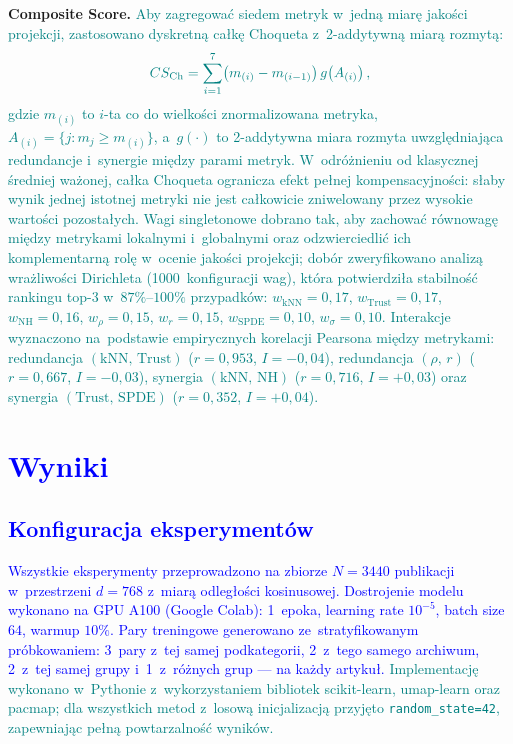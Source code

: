 \documentclass[a4paper,11pt,twocolumn]{article}
\newcommand{\hl}[1]{\textcolor{blue}{#1}}
\newcommand{\hlme}[1]{\textcolor{teal}{#1}}
\begin{document}
\textbf{Composite Score.}
\hlme{Aby zagregować siedem metryk w~jedną miarę jakości projekcji,
zastosowano dyskretną całkę Choqueta z~2-addytywną miarą rozmytą:}
\begin{equation}
  \hlme{CS_\text{Ch} = \sum_{i=1}^{7}
    \bigl(m_{(i)} - m_{(i-1)}\bigr)\, g\!\left(A_{(i)}\right),}
  \label{eq:choquet}
\end{equation}
\hlme{gdzie $m_{(i)}$ to $i$-ta co do wielkości znormalizowana metryka,
$A_{(i)} = \{j : m_j \geq m_{(i)}\}$, a~$g(\cdot)$ to 2-addytywna
miara rozmyta uwzględniająca redundancje i~synergie między parami metryk.
W~odróżnieniu od klasycznej średniej ważonej, całka Choqueta ogranicza
efekt pełnej kompensacyjności: słaby wynik jednej istotnej metryki
nie jest całkowicie zniwelowany przez wysokie wartości pozostałych.
Wagi singletonowe dobrano tak, aby zachować równowagę między metrykami
lokalnymi i~globalnymi oraz odzwierciedlić ich komplementarną rolę
w~ocenie jakości projekcji; dobór zweryfikowano analizą wrażliwości
Dirichleta (1000~konfiguracji wag), która potwierdziła stabilność
rankingu top-3 w~$87\%$--$100\%$ przypadków:
$w_\text{kNN}=0{,}17$, $w_\text{Trust}=0{,}17$, $w_\text{NH}=0{,}16$,
$w_\rho=0{,}15$, $w_r=0{,}15$, $w_\text{SPDE}=0{,}10$, $w_\sigma=0{,}10$.
Interakcje wyznaczono na~podstawie empirycznych korelacji Pearsona
między metrykami: redundancja
$(\text{kNN},\,\text{Trust})$ ($r=0{,}953$, $I=-0{,}04$),
redundancja $(\rho,\,r)$ ($r=0{,}667$, $I=-0{,}03$),
synergia $(\text{kNN},\,\text{NH})$ ($r=0{,}716$, $I=+0{,}03$)
oraz synergia $(\text{Trust},\,\text{SPDE})$ ($r=0{,}352$, $I=+0{,}04$).}


\section{\hl{Wyniki}}
\label{sec:results}

\subsection{\hl{Konfiguracja eksperymentów}}

\hl{Wszystkie eksperymenty przeprowadzono na zbiorze $N=3440$ publikacji
w~przestrzeni $d=768$ z~miarą odległości kosinusowej. Dostrojenie modelu
wykonano na GPU A100 (Google Colab): 1~epoka, learning rate $10^{-5}$,
batch size $64$, warmup $10\%$. Pary treningowe generowano ze~stratyfikowanym
próbkowaniem: 3~pary z~tej samej podkategorii, 2~z~tego samego archiwum,
2~z~tej samej grupy i~1~z~różnych grup --- na każdy artykuł.
\hlme{Implementację wykonano w~Pythonie z~wykorzystaniem bibliotek
scikit-learn, umap-learn oraz pacmap; dla wszystkich metod z~losową
inicjalizacją przyjęto \texttt{random\_state=42}, zapewniając
pełną powtarzalność wyników.
}}
\end{document}
